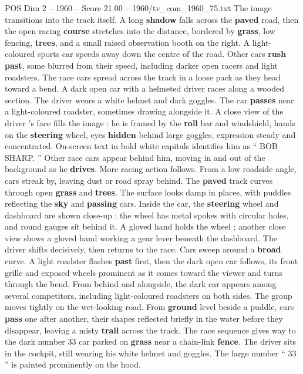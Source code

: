 \begin{textsample}{POS Dim 2 – 1960 – Score 21.00 – 1960/tv\_com\_1960\_75.txt}
The image transitions into the track itself.
A long \textbf{shadow} falls across the \textbf{paved} road, then the open racing \textbf{course} stretches into the distance, bordered by \textbf{grass}, low fencing, \textbf{trees}, and a small raised observation booth on the right.
A light-coloured sports car speeds away down the centre of the road.
Other cars \textbf{rush} \textbf{past}, some blurred from their speed, including darker open racers and light roadsters.
The race cars spread across the track in a loose pack as they head toward a bend.
A dark open car with a helmeted driver races along a wooded section.
The driver wears a white helmet and dark goggles.
The car \textbf{passes} near a light-coloured roadster, sometimes drawing alongside it.
A close view of the driver ’s face fills the image : he is framed by the \textbf{roll} bar and windshield, hands on the \textbf{steering} wheel, eyes \textbf{hidden} behind large goggles, expression steady and concentrated.
On-screen text in bold white capitals identifies him as “ BOB SHARP. ” Other race cars appear behind him, moving in and out of the background as he \textbf{drives}.
More racing action follows.
From a low roadside angle, cars streak by, leaving dust or road spray behind.
The \textbf{paved} track curves through open \textbf{grass} and \textbf{trees}.
The surface looks damp in places, with puddles reflecting the \textbf{sky} and \textbf{passing} cars.
Inside the car, the \textbf{steering} wheel and dashboard are shown close-up : the wheel has metal spokes with circular holes, and round gauges sit behind it.
A gloved hand holds the wheel ; another close view shows a gloved hand working a gear lever beneath the dashboard.
The driver shifts decisively, then returns to the race.
Cars sweep around a \textbf{broad} curve.
A light roadster flashes \textbf{past} first, then the dark open car follows, its front grille and exposed wheels prominent as it comes toward the viewer and turns through the bend.
From behind and alongside, the dark car appears among several competitors, including light-coloured roadsters on both sides.
The group moves tightly on the wet-looking road.
From \textbf{ground} level beside a puddle, cars \textbf{pass} one after another, their shapes reflected briefly in the water before they disappear, leaving a misty \textbf{trail} across the track.
The race sequence gives way to the dark number 33 car parked on \textbf{grass} near a chain-link \textbf{fence}.
The driver sits in the cockpit, still wearing his white helmet and goggles.
The large number “ 33 ” is painted prominently on the hood.

\end{textsample}
